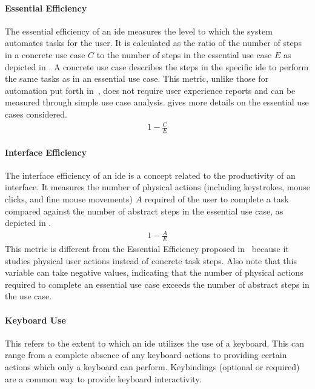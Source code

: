 \paragraph{Essential Efficiency}
The essential efficiency of an \ac{ide} measures the level to which the system automates tasks for the user.
It is calculated as the ratio of the number of steps in a concrete use case $C$ to the number of steps in the essential use case $E$ as depicted in .
A concrete use case describes the steps in the specific \ac{ide} to perform the same tasks as in an essential use case.
This metric, unlike those for automation put forth in~\cite{wei1998}, does not require user experience reports and can be measured through simple use case analysis.
 gives more details on the essential use cases considered.
%
\begin{align}\label{eq:eefficiency}
  1 - \frac{C}{E}
\end{align}


\paragraph{Interface Efficiency}
The interface efficiency of an \ac{ide} is a concept related to the productivity of an interface.
It measures the number of physical actions (including keystrokes, mouse clicks, and fine mouse movements) $A$ required of the user to complete a task compared against the number of abstract steps in the essential use case, as depicted in .
%
\begin{align}\label{eq:iefficiency}
  1 - \frac{A}{E}
\end{align}
%
This metric is different from the Essential Efficiency proposed in~\cite{constantine1996} because it studies physical user actions instead of concrete task steps.
Also note that this variable can take negative values, indicating that the number of physical actions required to complete an essential use case exceeds the number of abstract steps in the use case.


\paragraph{Keyboard Use}
This refers to the extent to which an \ac{ide} utilizes the use of a keyboard.
This can range from a complete absence of any keyboard actions to providing
certain actions which only a keyboard can perform. Keybindings (optional or
required) are a common way to provide keyboard interactivity.

